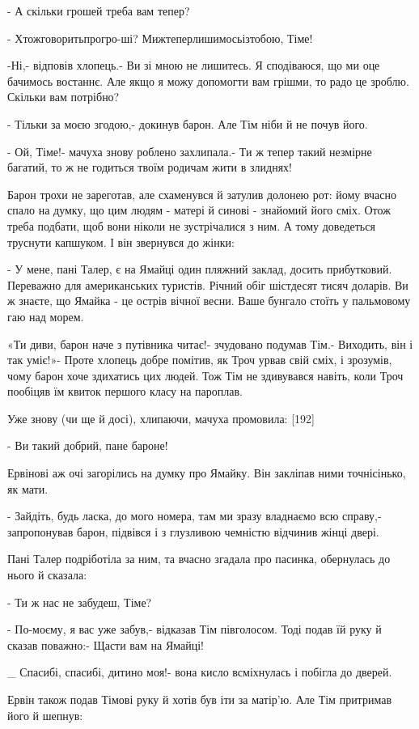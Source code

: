 - А скільки грошей треба вам тепер?

- Хтожговоритьпрогро-ші? Мижтеперлишимосьізтобою, Тіме!

-Ні,- відповів хлопець.- Ви зі мною не лишитесь. Я сподіваюся, що ми оце бачимось востаннє. Але якщо я можу допомогти вам грішми, то радо це зроблю. Скільки вам потрібно?

- Тільки за моєю згодою,- докинув барон. Але Тім ніби й не почув його.

- Ой, Тіме!- мачуха знову роблено захлипала.- Ти ж тепер такий незмірне багатий, то ж не годиться твоїм родичам жити в злиднях!

Барон трохи не зареготав, але схаменувся й затулив долонею рот: йому вчасно спало на думку, що цим людям - матері й синові - знайомий його сміх. Отож треба подбати, щоб вони ніколи не зустрічалися з ним. А тому доведеться труснути капшуком. І він звернувся до жінки:

- У мене, пані Талер, є на Ямайці один пляжний заклад, досить прибутковий. Переважно для американських туристів. Річний обіг шістдесят тисяч доларів. Ви ж знаєте, що Ямайка - це острів вічної весни. Ваше бунгало стоїть у пальмовому гаю над морем.

«Ти диви, барон наче з путівника читає!- зчудовано подумав Тім.- Виходить, він і так уміє!»- Проте хлопець добре помітив, як Троч урвав свій сміх, і зрозумів, чому барон хоче здихатись цих людей. Тож Тім не здивувався навіть, коли Троч пообіцяв їм квиток першого класу на пароплав.

Уже знову (чи ще й досі), хлипаючи, мачуха промовила: [192]

- Ви такий добрий, пане бароне!

Ервінові аж очі загорілись на думку про Ямайку. Він закліпав ними точнісінько, як мати.

- Зайдіть, будь ласка, до мого номера, там ми зразу владнаємо всю справу,- запропонував барон, підвівся і з глузливою чемністю відчинив жінці двері.

Пані Талер подріботіла за ним, та вчасно згадала про пасинка, обернулась до нього й сказала:

- Ти ж нас не забудеш, Тіме?

- По-моєму, я вас уже забув,- відказав Тім півголосом. Тоді подав їй руку й сказав поважно:- Щасти вам на Ямайці!

_ Спасибі, спасибі, дитино моя!- вона кисло всміхнулась і побігла до дверей.

Ервін також подав Тімові руку й хотів був іти за матір'ю. Але Тім притримав його й шепнув:

